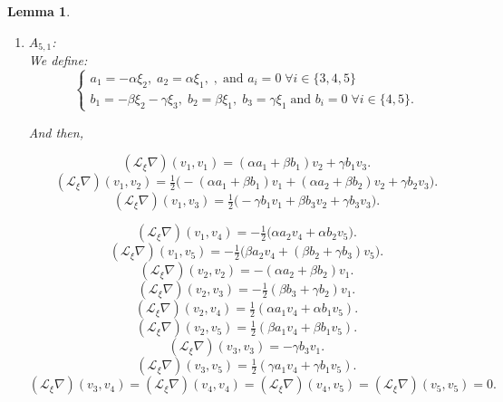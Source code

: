 \documentclass[10pt]{article}
\newtheorem{Lemma}{Lemma}
\begin{document}
\begin{Lemma}
\begin{enumerate}
  \item \(A_{5,1}\):\\
  
  We define:
\[\begin{cases} 
a_1=-\alpha \xi_2,\; a_2=\alpha \xi_1,\; 
,\; \text{and $a_i=0$}\; \forall i\in \{3,4,5\}\\ 
b_1=-\beta \xi_2 - \gamma \xi_3 ,\; 
b_2= \beta \xi_1, \; b_3= \gamma \xi_1\; \text{and $b_i=0$} \;\forall i\in \{4,5\}.
\end{cases}\]

And then,

\begin{equation}
  (\mathscr{L}_\xi\nabla) (v_1,v_1)=(\alpha a_1+\beta b_1)v_2+\gamma b_1v_3.  \label{(1)}
\end{equation}
\begin{equation}
 (\mathscr{L}_\xi\nabla) (v_1,v_2)=\tfrac{1}{2}\Big(-(\alpha a_1+\beta b_1)v_1+(\alpha a_2+\beta b_2)v_2+\gamma b_2v_3\Big). \label{(2)}  
\end{equation}
\begin{equation}
   (\mathscr{L}_\xi\nabla) (v_1,v_3)=\tfrac{1}{2}\Big(-\gamma b_1 v_1+\beta b_3v_2+\gamma b_3v_3\Big). \label{(3)}
\end{equation}

\begin{equation}
    (\mathscr{L}_\xi\nabla) (v_1,v_4)=-\tfrac{1}{2}\Big(\alpha a_2v_4+\alpha b_2 v_5\Big).\label{(4)}
\end{equation}
\begin{equation}
    (\mathscr{L}_\xi\nabla) (v_1,v_5)=-\tfrac{1}{2}\Big(\beta a_2v_4+(\beta b_2+\gamma b_3)v_5\Big).\label{(5)}
\end{equation}
\begin{equation}
    (\mathscr{L}_\xi\nabla) (v_2,v_2)=-(\alpha a_2+\beta b_2)v_1.\label{(6)}
\end{equation}
\begin{equation}
   (\mathscr{L}_\xi\nabla) (v_2,v_3)=-\tfrac{1}{2}(\beta b_3+\gamma b_2)v_1. \label{(7)}
\end{equation}
\begin{equation}
  (\mathscr{L}_\xi\nabla) (v_2,v_4)=\tfrac{1}{2}(\alpha a_1v_4+\alpha b_1v_5). \label{(8)} 
\end{equation}
\begin{equation}
    (\mathscr{L}_\xi\nabla) (v_2,v_5)=\tfrac{1}{2}(\beta a_1 v_4 +\beta b_1v_5).\label{(9)}
\end{equation}
\begin{equation}
    (\mathscr{L}_\xi\nabla) (v_3,v_3)=-\gamma b_3v_1.\label{(10)}
\end{equation}
\begin{equation}
    (\mathscr{L}_\xi\nabla) (v_3,v_5)=\tfrac{1}{2}(\gamma a_1v_4+ \gamma b_1v_5).\label{(11)}
\end{equation}
\begin{equation}
  (\mathscr{L}_\xi\nabla) (v_3,v_4)=(\mathscr{L}_\xi\nabla) (v_4,v_4)= 
(\mathscr{L}_\xi\nabla) (v_4,v_5)= 
(\mathscr{L}_\xi\nabla) (v_5,v_5)=0. \label{(11)} 
\end{equation}


\end{enumerate}
\end{Lemma}
\end{document}
